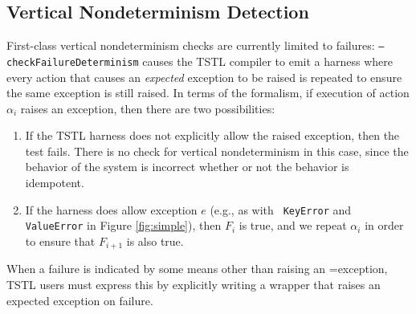 \subsection{Vertical Nondeterminism Detection}
\label{sec:vertimp}

First-class vertical nondeterminism checks are currently
limited to failures:  {\tt --checkFailureDeterminism} causes the TSTL
compiler to emit a harness where every action that causes an \emph{expected}
exception to be raised is repeated to ensure the same exception is
still raised.  In terms of the formalism, if execution of action
$\alpha_i$ raises an exception, then there are two possibilities:

\begin{enumerate}
\item If the TSTL harness does not explicitly allow the raised
  exception, then the test fails.  There is no check for vertical
  nondeterminism in this case, since the behavior of the system is
  incorrect whether or not the behavior is idempotent.
  \item If the harness does allow exception $e$ (e.g., as with {\tt
      KeyError} and {\tt ValueError} in Figure \ref{fig:simple}), then
    $F_i$ is true, and we repeat $\alpha_i$ in order to ensure that
    $F_{i+1}$ is also true.
    \end{enumerate}

When a failure is indicated by some means other than raising an
=exception, TSTL users must express this by explicitly writing
a wrapper that raises an expected exception on failure.

